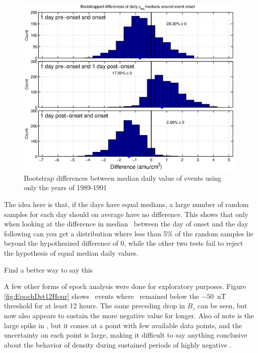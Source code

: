 \begin{figure}[htp!]
	\centering
	\includegraphics[width=1\linewidth]{Figures/DailyBootstrapDifferences-GOES6-case13}
	\caption{Bootstrap differences between median daily value of events using only the years of 1989-1991}
	\label{fig:DailyBootstrapDifferences}
\end{figure}

The idea here is that, if the days have equal medians, a large number of random samples for each day should on average have no difference. This shows that only when looking at the difference in median \req\ between the day of onset and the day following can you get a distribution where less than 5\% of the random samples lie beyond the hypothesized difference of 0, while the other two tests fail to reject the hypothesis of equal median daily values.  

\vnote Find a better way to say this

A few other forms of epoch analysis were done for exploratory purposes. Figure \ref{fig:EpochDst12Hour} shows \dst\ events where \dst\ remained below the $-50$~nT threshold for at least 12 hours. The same preceding drop in $B_z$ can be seen, but now also appears to sustain the more negative value for longer. Also of note is the large spike in \req, but it comes at a point with few available data points, and the uncertainty on each point is large, making it difficult to say anything conclusive about the behavior of density during sustained periods of highly negative \dst.

